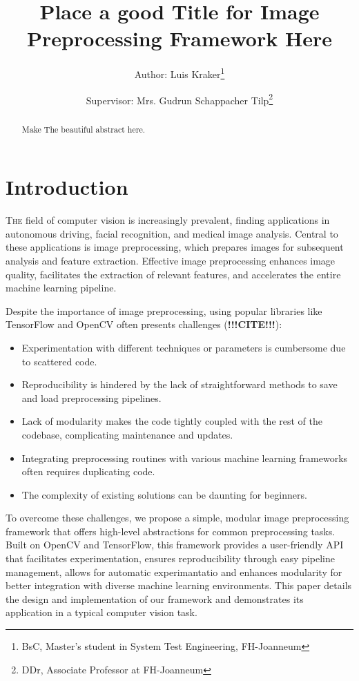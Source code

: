 \documentclass[journal ]{new-aiaa}
\title{Place a good Title for Image Preprocessing Framework Here}
\author{Author: Luis Kraker\footnote{BsC, Master's student in System Test Engineering, FH-Joanneum}}
\affil{FH-Joanneum, Graz 8020, Austria}
\author{Supervisor: Mrs. Gudrun Schappacher Tilp\footnote{DDr, Associate Professor at FH-Joanneum}}
\affil{FH-Joanneum, Graz 8020, Austria}
\begin{document}
\maketitle

\begin{abstract}
	Make The beautiful abstract here.
\end{abstract}



\section{Introduction}
\lettrine{T}{he} field of computer vision is increasingly prevalent, finding applications in autonomous driving, facial recognition, and medical image analysis. Central to these applications is image preprocessing, which prepares images for subsequent analysis and feature extraction. Effective image preprocessing enhances image quality, facilitates the extraction of relevant features, and accelerates the entire machine learning pipeline.

Despite the importance of image preprocessing, using popular libraries like TensorFlow and OpenCV often presents challenges (\textbf{!!!CITE!!!}):
\begin{itemize}
    \item Experimentation with different techniques or parameters is cumbersome due to scattered code.
    \item Reproducibility is hindered by the lack of straightforward methods to save and load preprocessing pipelines.
    \item Lack of modularity makes the code tightly coupled with the rest of the codebase, complicating maintenance and updates.
    \item Integrating preprocessing routines with various machine learning frameworks often requires duplicating code.
    \item The complexity of existing solutions can be daunting for beginners.
\end{itemize}

To overcome these challenges, we propose a simple, modular image preprocessing framework that offers high-level abstractions for common preprocessing tasks. Built on OpenCV and TensorFlow, this framework provides a user-friendly API that facilitates experimentation, ensures reproducibility through easy pipeline management, allows for automatic experimantatio and enhances modularity for better integration with diverse machine learning environments. This paper details the design and implementation of our framework and demonstrates its application in a typical computer vision task.
\end{document}
